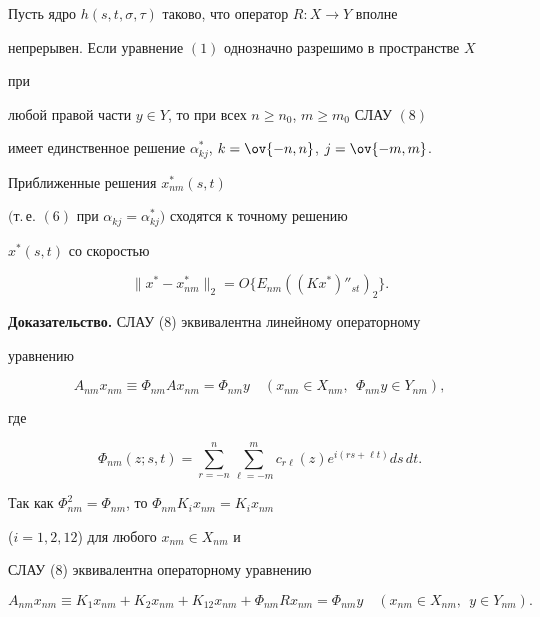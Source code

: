  


\begin{thm} 


Пусть ядро $h(s,t,\sigma,\tau)$ таково, что оператор $R:X\to Y$ вполне  


непрерывен. Если уравнение $(1)$ однозначно разрешимо в пространстве $X$ 


при  


любой правой части $y\in Y$, то при всех $n\ge n_0$, $m\ge m_0$ СЛАУ $(8)$ 


имеет единственное решение $\alpha^*_{kj}$, $k=\ov{-n,n}$, $j=\ov{-m,m}$. 


Приближенные решения $x^*_{nm}(s,t)$  


$($т.\,е. $(6)$ при $\alpha_{kj}=\alpha^*_{kj})$ сходятся к точному решению 


$x^*(s,t)$ со скоростью 


$$ 


\|x^*-x^*_{nm}\|_2=O\{E_{nm}((Kx^*)''_{st})_2\}. 


$$ 


\end{thm} 


 


{\bf Доказательство.} СЛАУ (8) эквивалентна линейному операторному  


уравнению 


$$ 


A_{nm}x_{nm}\equiv\Phi_{nm}Ax_{nm}=\Phi_{nm}y \quad 


(x_{nm}\in X_{nm},\ \ \Phi_{nm}y\in Y_{nm}), 


$$ 


где  


$$ 


\Phi_{nm}(z;s,t)=\sum^n_{r=-n}\sum^m_{\ell=-m}c_{r\ell} 


(z)e^{i(rs+\ell t)}ds\,dt. 


$$ 


Так как $\Phi^2_{nm}=\Phi_{nm}$, то $\Phi_{nm}K_i x_{nm}=K_i x_{nm}$ 


($i=1,2,12$) для любого $x_{nm}\in X_{nm}$ и  


СЛАУ (8) эквивалентна операторному уравнению 


\begin{equation} 


A_{nm}x_{nm}\equiv K_1x_{nm}+K_2x_{nm}+ 


K_{12}x_{nm}+\Phi_{nm}R x_{nm}=\Phi_{nm}y\quad 


(x_{nm}\in X_{nm},\ \ y\in Y_{nm}). 


\end{equation} 


